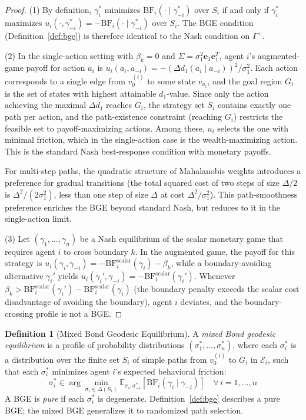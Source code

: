 \documentclass[12pt]{article}
\theoremstyle{definition}
\newtheorem{definition}[theorem]{Definition}
\theoremstyle{remark}
\newcommand{\E}{\mathcal{E}}               %
\newcommand{\BF}{\mathrm{BF}}              %
\begin{document}
\begin{proof}
(1) By definition, $\gamma_i^*$ minimizes $\BF_i(\cdot \mid \gamma_{-i}^*)$ over $S_i$ if and only if $\gamma_i^*$ maximizes $u_i(\cdot, \gamma_{-i}^*) = -\BF_i(\cdot \mid \gamma_{-i}^*)$ over $S_i$.  The BGE condition (Definition~\ref{def:bge}) is therefore identical to the Nash condition on $\Gamma^+$.

(2) In the single-action setting with $\beta_k = 0$ and $\Sigma = \sigma_1^2 \mathbf{e}_1 \mathbf{e}_1^T$, agent $i$'s augmented-game payoff for action $a_i$ is $u_i(a_i, a_{-i}) = -(\Delta d_1(a_i \mid a_{-i}))^2/\sigma_1^2$.  Each action corresponds to a single edge from $v_0^{(i)}$ to some state $v_{a_i}$, and the goal region $G_i$ is the set of states with highest attainable $d_1$-value.  Since only the action achieving the maximal $\Delta d_1$ reaches $G_i$, the strategy set $S_i$ contains exactly one path per action, and the path-existence constraint (reaching $G_i$) restricts the feasible set to payoff-maximizing actions.  Among these, $u_i$ selects the one with minimal friction, which in the single-action case is the wealth-maximizing action.  This is the standard Nash best-response condition with monetary payoffs.

For multi-step paths, the quadratic structure of Mahalanobis weights introduces a preference for gradual transitions (the total squared cost of two steps of size $\Delta/2$ is $\Delta^2/(2\sigma_1^2)$, less than one step of size $\Delta$ at cost $\Delta^2/\sigma_1^2$).  This path-smoothness preference enriches the BGE beyond standard Nash, but reduces to it in the single-action limit.

(3) Let $(\gamma_1, \ldots, \gamma_n)$ be a Nash equilibrium of the scalar monetary game that requires agent $i$ to cross boundary $k$.  In the augmented game, the payoff for this strategy is $u_i(\gamma_i, \gamma_{-i}) = -\BF_i^{\text{scalar}}(\gamma_i) - \beta_k$, while a boundary-avoiding alternative $\gamma_i'$ yields $u_i(\gamma_i', \gamma_{-i}) = -\BF_i^{\text{scalar}}(\gamma_i')$.  Whenever $\beta_k > \BF_i^{\text{scalar}}(\gamma_i') - \BF_i^{\text{scalar}}(\gamma_i)$ (the boundary penalty exceeds the scalar cost disadvantage of avoiding the boundary), agent $i$ deviates, and the boundary-crossing profile is not a BGE.
\end{proof}

\begin{definition}[Mixed Bond Geodesic Equilibrium]
\label{def:mixed_bge}
A \emph{mixed Bond geodesic equilibrium} is a profile of probability distributions $(\sigma_1^*, \ldots, \sigma_n^*)$, where each $\sigma_i^*$ is a distribution over the finite set $S_i$ of simple paths from $v_0^{(i)}$ to $G_i$ in $\E_i$, such that each $\sigma_i^*$ minimizes agent $i$'s expected behavioral friction:
\[
\sigma_i^* \in \arg\min_{\sigma_i \in \Delta(S_i)} \mathbb{E}_{\sigma_i, \sigma_{-i}^*}[\BF_i(\gamma_i \mid \gamma_{-i})] \quad \forall\, i = 1, \ldots, n
\]
A BGE is \emph{pure} if each $\sigma_i^*$ is degenerate.  Definition~\ref{def:bge} describes a pure BGE; the mixed BGE generalizes it to randomized path selection.
\end{definition}
\end{document}
